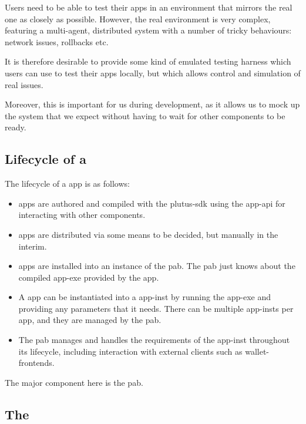 \documentclass[plutus.tex]{subfiles}
\begin{document}
\begin{requirement}
\label{req:app-emulation}
Users need to be able to test their \glspl{app} in an environment that mirrors the real one as closely as possible.
However, the real environment is very complex, featuring a multi-agent, distributed system with a number of tricky behaviours: network issues, rollbacks etc.

It is therefore desirable to provide some kind of emulated testing harness which users can use to test their \glspl{app} locally, but which allows control and simulation of real issues.

Moreover, this is important for us during development, as it allows us to mock up the system that we expect without having to wait for other components to be ready.
\end{requirement}

\subsection{Lifecycle of a }

The lifecycle of a \gls{app} is as follows:

\begin{itemize}
\item
  \Glspl{app} are authored and compiled with the \gls{plutus-sdk} using the \gls{app-api} for interacting with other components.
\item
  \Glspl{app} are distributed via some means to be decided, but manually in the interim.
\item
  \Glspl{app} are installed into an instance of the \gls{pab}. The \gls{pab} just knows about the compiled \gls{app-exe} provided by the \gls{app}.
\item
  A \gls{app} can be instantiated into a \gls{app-inst} by running the \gls{app-exe} and providing any parameters that it needs.
  There can be multiple \glspl{app-inst} per \gls{app}, and they are managed by the \gls{pab}.
\item
  The \gls{pab} manages and handles the requirements of the \gls{app-inst} throughout its lifecycle, including interaction with external clients such as \glspl{wallet-frontend}.
\end{itemize}

The major component here is the \gls{pab}.

\subsection{The }
\label{sec:pab}
\end{document}
